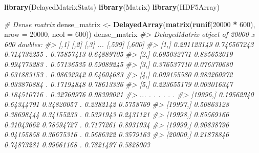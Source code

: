 \documentclass[]{book}
\newenvironment{Shaded}{\begin{snugshade}}{\end{snugshade}}
\newcommand{\KeywordTok}[1]{\textcolor[rgb]{0.13,0.29,0.53}{\textbf{#1}}}
\newcommand{\DataTypeTok}[1]{\textcolor[rgb]{0.13,0.29,0.53}{#1}}
\newcommand{\DecValTok}[1]{\textcolor[rgb]{0.00,0.00,0.81}{#1}}
\newcommand{\StringTok}[1]{\textcolor[rgb]{0.31,0.60,0.02}{#1}}
\newcommand{\CommentTok}[1]{\textcolor[rgb]{0.56,0.35,0.01}{\textit{#1}}}
\newcommand{\OperatorTok}[1]{\textcolor[rgb]{0.81,0.36,0.00}{\textbf{#1}}}
\newcommand{\NormalTok}[1]{#1}
\begin{document}
\begin{Shaded}
\begin{Highlighting}[]
\KeywordTok{library}\NormalTok{(DelayedMatrixStats)}
\KeywordTok{library}\NormalTok{(Matrix)}
\KeywordTok{library}\NormalTok{(HDF5Array)}

\CommentTok{# Dense matrix}
\NormalTok{dense_matrix <-}\StringTok{ }\KeywordTok{DelayedArray}\NormalTok{(}\KeywordTok{matrix}\NormalTok{(}\KeywordTok{runif}\NormalTok{(}\DecValTok{20000} \OperatorTok{*}\StringTok{ }\DecValTok{600}\NormalTok{), }\DataTypeTok{nrow =} \DecValTok{20000}\NormalTok{,}
                                  \DataTypeTok{ncol =} \DecValTok{600}\NormalTok{))}
\NormalTok{dense_matrix}
\CommentTok{#> DelayedMatrix object of 20000 x 600 doubles:}
\CommentTok{#>                 [,1]        [,2]        [,3] ...     [,599]     [,600]}
\CommentTok{#>     [1,] 0.291123149 0.746567243 0.714732255   . 0.75857413 0.64889705}
\CommentTok{#>     [2,] 0.695032771 0.835652019 0.994773283   . 0.57136535 0.59089245}
\CommentTok{#>     [3,] 0.376537710 0.076370680 0.631883153   . 0.08632942 0.64604683}
\CommentTok{#>     [4,] 0.099155580 0.983260972 0.033870884   . 0.17194848 0.78613336}
\CommentTok{#>     [5,] 0.223655179 0.003016347 0.184510716   . 0.32769976 0.98399021}
\CommentTok{#>      ...           .           .           .   .          .          .}
\CommentTok{#> [19996,]  0.19562940  0.64344791  0.34820057   .  0.2382142  0.5758769}
\CommentTok{#> [19997,]  0.50863128  0.38698444  0.34155233   .  0.5391943  0.2431121}
\CommentTok{#> [19998,]  0.85569166  0.31043662  0.78594727   .  0.7177261  0.8931934}
\CommentTok{#> [19999,]  0.90838796  0.04155858  0.36675316   .  0.5686322  0.3579163}
\CommentTok{#> [20000,]  0.21878846  0.74873281  0.99661168   .  0.7821497  0.5828003}


\end{Highlighting}
\end{Shaded}
\end{document}
